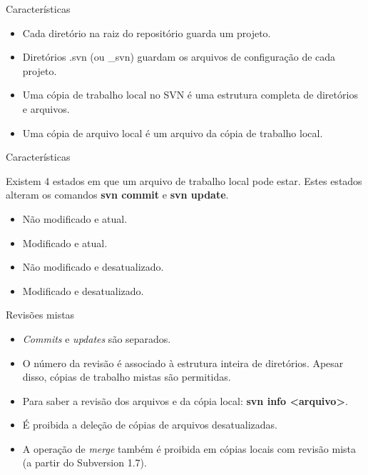\documentclass[a4paper]{beamer}
\begin{document}
\begin{frame}{Características}

\begin{itemize}[<+->]
\item Cada diretório na raiz do repositório guarda um projeto.
\item Diretórios .svn (ou \_svn) guardam os arquivos de configuração de cada projeto.
\item Uma cópia de trabalho local no SVN é uma estrutura completa de diretórios e arquivos.
\item Uma cópia de arquivo local é um arquivo da cópia de trabalho local.
\end{itemize}

\end{frame}

\begin{frame}{Características}

Existem 4 estados em que um arquivo de trabalho local pode estar. Estes estados alteram os comandos \textbf{svn commit} e \textbf{svn update}.

\pause
\begin{itemize}[<+->]
\item Não modificado e atual.
\item Modificado e atual.
\item Não modificado e desatualizado.
\item Modificado e desatualizado.
\end{itemize}

\end{frame}

\begin{frame}{Revisões mistas}

\begin{itemize}[<+->]
\item \textit{Commits} e \textit{updates} são separados.
\item O número da revisão é associado à estrutura inteira de diretórios. Apesar disso, cópias de trabalho mistas são permitidas.
\item Para saber a revisão dos arquivos e da cópia local: \textbf{svn info <arquivo>}.
\item É proibida a deleção de cópias de arquivos desatualizadas.
\item A operação de \textit{merge} também é proibida em cópias locais com revisão mista (a partir do Subversion 1.7).
\end{itemize}

\end{frame}
\end{document}
